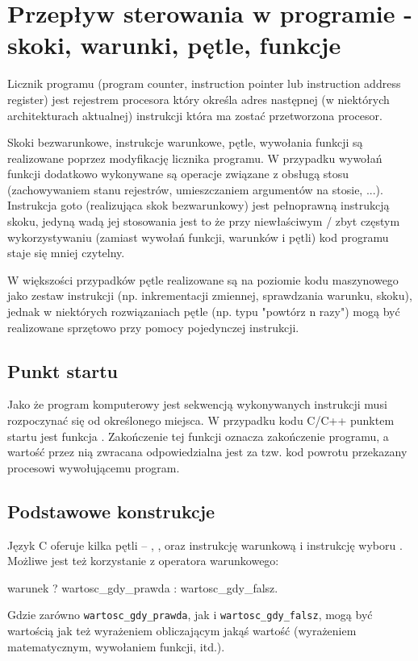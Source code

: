 \section{Przepływ sterowania w programie - skoki, warunki, pętle, funkcje}

Licznik programu (program counter, instruction pointer lub instruction address register) jest rejestrem procesora który określa adres następnej (w niektórych architekturach aktualnej) instrukcji która ma zostać przetworzona procesor.

Skoki bezwarunkowe, instrukcje warunkowe, pętle, wywołania funkcji są realizowane poprzez modyfikację licznika programu. W przypadku wywołań funkcji dodatkowo wykonywane są operacje związane z obsługą stosu (zachowywaniem stanu rejestrów, umieszczaniem argumentów na stosie, ...). Instrukcja goto (realizująca skok bezwarunkowy) jest pełnoprawną instrukcją skoku, jedyną wadą jej stosowania jest to że przy niewłaściwym / zbyt częstym wykorzystywaniu (zamiast wywołań funkcji, warunków i pętli) kod programu staje się mniej czytelny.

W większości przypadków pętle realizowane są na poziomie kodu maszynowego jako zestaw instrukcji (np. inkrementacji zmiennej, sprawdzania warunku, skoku), jednak w niektórych rozwiązaniach pętle (np. typu "powtórz n razy") mogą być realizowane sprzętowo przy pomocy pojedynczej instrukcji.

\subsection{Punkt startu}

Jako że program komputerowy jest sekwencją wykonywanych instrukcji musi rozpoczynać się od określonego miejsca.
W przypadku kodu C/C++ punktem startu jest funkcja . Zakończenie tej funkcji oznacza zakończenie programu, a wartość przez nią zwracana odpowiedzialna jest za tzw. kod powrotu przekazany procesowi wywołującemu program. 

\subsection{Podstawowe konstrukcje}

Język C oferuje kilka pętli – , ,  oraz instrukcję warunkową  i instrukcję wyboru .
Możliwe jest też korzystanie z operatora warunkowego:

\begin{CodeFrame*}[c]{}
warunek ? wartosc_gdy_prawda : wartosc_gdy_falsz.
\end{CodeFrame*}
Gdzie zarówno \Verb#wartosc_gdy_prawda#, jak i  \Verb#wartosc_gdy_falsz#, mogą być wartością jak też wyrażeniem obliczającym jakąś wartość (wyrażeniem matematycznym, wywołaniem funkcji, itd.).

